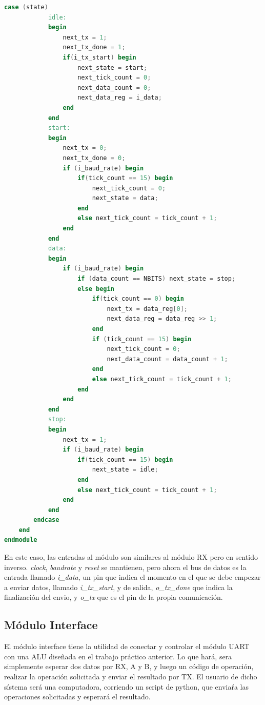 \documentclass{article}
\begin{document}
\begin{lstlisting}[language=Verilog]
        case (state)
            idle:
            begin
                next_tx = 1;
                next_tx_done = 1;
                if(i_tx_start) begin
                    next_state = start;
                    next_tick_count = 0;
                    next_data_count = 0;
                    next_data_reg = i_data;
                end
            end
            start:
            begin
                next_tx = 0;
                next_tx_done = 0;
                if (i_baud_rate) begin
                    if(tick_count == 15) begin
                        next_tick_count = 0;
                        next_state = data;
                    end
                    else next_tick_count = tick_count + 1;
                end
            end
            data:
            begin
                if (i_baud_rate) begin
                    if (data_count == NBITS) next_state = stop;
                    else begin
                        if(tick_count == 0) begin
                            next_tx = data_reg[0];
                            next_data_reg = data_reg >> 1;
                        end
                        if (tick_count == 15) begin
                            next_tick_count = 0;
                            next_data_count = data_count + 1;
                        end
                        else next_tick_count = tick_count + 1;
                    end
                end
            end
            stop:
            begin
                next_tx = 1;
                if (i_baud_rate) begin
                    if(tick_count == 15) begin
                        next_state = idle;
                    end
                    else next_tick_count = tick_count + 1;
                end
            end
        endcase
    end
endmodule
\end{lstlisting}

En este caso, las entradas al módulo son similares al módulo RX pero en sentido inverso. \textit{clock}, \textit{baudrate} y \textit{reset} se mantienen, pero ahora el bus de datos es la entrada llamado \textit{i\_data}, un pin que indica el momento en el que se debe empezar a enviar datos, llamado \textit{i\_tx\_start}, y de salida, \textit{o\_tx\_done} que indica la finalización del envio, y \textit{o\_tx} que es el pin de la propia comunicación.

\subsection{Módulo Interface}

El módulo interface tiene la utilidad de conectar y controlar el módulo UART con una ALU diseñada en el trabajo práctico
anterior. Lo que hará, sera simplemente esperar dos datos por RX, A y B, y luego un código de operación, realizar la operación solicitada
y enviar el resultado por TX. El usuario de dicho sístema será una computadora, corriendo un script de python, que enviaŕa las operaciones solicitadas y esperará el resultado.
\end{document}
